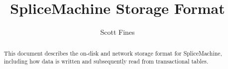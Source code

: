 \documentclass[10pt]{amsart}
\begin{document}
\title{SpliceMachine Storage Format}
\author{Scott Fines}

\begin{abstract}
This document describes the on-disk and network storage format for SpliceMachine, including how data is written and subsequently read from transactional tables.
\end{abstract}

\maketitle


\end{document}
